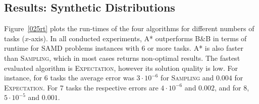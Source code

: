\documentclass[letterpaper]{article} %
\newcommand{\samd}{\ac{SAMD}\xspace}
\newcommand{\astar}{\textsc{A*}\xspace}
\newcommand{\sampling}{\textsc{Sampling}\xspace}
\newcommand{\expectation}{\textsc{Expectation}\xspace}
\newcommand{\bnb}{\textsc{B\&B}\xspace}
\newcommand{\commentout}[1]{}
\begin{document}

\subsection{Results: Synthetic Distributions}
\label{sec:res}

Figure~\ref{025rt} plots the run-times of the four algorithms for different numbers of tasks ($x$-axis).
In all conducted experiments, \astar outperforms \bnb in terms of runtime 
for \samd problems instances with 6 or more tasks. \astar is also faster than \sampling, which in most cases returns non-optimal results. The fastest evaluated algorithm is \expectation, however its solution quality is low. For instance, for 6 tasks the average error was $3\cdot 10^{-6}$ for \sampling and $0.004$ for \expectation. For 7 tasks the respective errors are $4 \cdot 10^{-6}$ and $0.002$, and for 8, $5 \cdot 10^{-5}$ and $0.001$.

\commentout{
returning in some cases an error of 1.  
For instance, for 6 tasks the average error was $3\cdot 10^{-6}$ for \expectation and $0.004$ for \sampling. For 7 tasks the respective errors are $4 \cdot 10^{-6}$ and $0.002$. %
}
\end{document}
